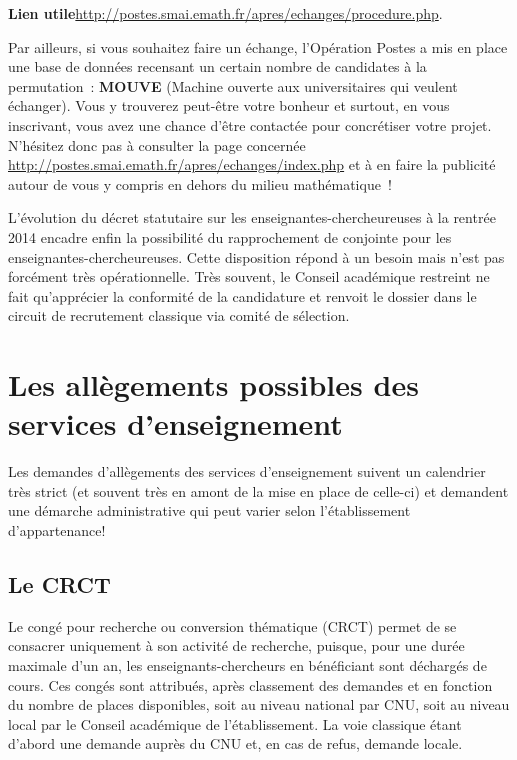 \textbf{Lien utile\hspace{.5em}}\url{http://postes.smai.emath.fr/apres/echanges/procedure.php}.

Par ailleurs, si vous souhaitez faire un \'echange, l'Op\'eration
Postes a mis en place une base de donn\'ees recensant un certain
nombre de candidat\mp e\mp s \`a la permutation~: \textbf{MOUVE} (Machine
ouverte aux universitaires qui veulent \'echanger). Vous y trouverez
peut-\^etre votre bonheur et surtout, en vous inscrivant, vous avez
une chance d'\^etre contact\'e\mp e pour concr\'etiser votre projet.
N'h\'esitez donc pas \`a consulter la page concern\'ee
\url{http://postes.smai.emath.fr/apres/echanges/index.php}
et \`a en faire la publicit\'e autour de vous
y compris en dehors du milieu math\'ematique~!

L'\'evolution du d\'ecret statutaire sur les enseignant\mp e\mp s-chercheur\mp euse\mp s \`a la rentr\'ee 2014 
encadre enfin la possibilit\'e du rapprochement de conjoint\mp e pour les enseignant\mp e\mp s-chercheur\mp euse\mp s. 
Cette disposition r\'epond \`a un besoin mais n'est pas forc\'ement tr\`es op\'erationnelle. 
Tr\`es souvent, le Conseil acad\'emique restreint ne
fait qu'appr\'ecier la conformit\'e de la candidature et renvoit le dossier dans le circuit de recrutement classique via comit\'e de s\'election.


\section{Les all\`egements possibles des services d'enseignement}

Les demandes d'all\`egements des services d'enseignement suivent un calendrier tr\`es strict
(et souvent tr\`es en amont de la mise en place de celle-ci)
et demandent une d\'emarche administrative qui peut varier selon l'\'etablissement d'appartenance!

\subsection{Le CRCT}
\label{CRCT}


Le cong\'e pour recherche ou conversion th\'ematique (CRCT) permet
de se consacrer uniquement \`a son activit\'e de recherche, puisque,
pour une dur\'ee maximale d'un an, les enseignants-chercheurs en
b\'en\'eficiant sont d\'echarg\'es de cours. Ces cong\'es sont
attribu\'es, apr\`es classement des demandes et en fonction du nombre
de places disponibles, soit au niveau national par CNU, soit  au niveau local par le Conseil
acad\'emique de l'\'etablissement. La voie classique \'etant d'abord une demande
aupr\`es du CNU et, en cas de refus, demande locale.

